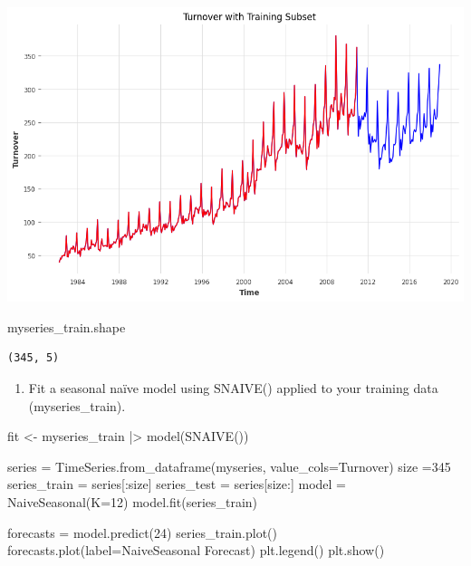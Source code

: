 \documentclass[
  11pt,
]{article}
\newenvironment{Shaded}{\begin{snugshade}}{\end{snugshade}}
\newcommand{\DecValTok}[1]{\textcolor[rgb]{0.68,0.00,0.00}{#1}}
\newcommand{\NormalTok}[1]{\textcolor[rgb]{0.00,0.23,0.31}{#1}}
\newcommand{\OperatorTok}[1]{\textcolor[rgb]{0.37,0.37,0.37}{#1}}
\newcommand{\StringTok}[1]{\textcolor[rgb]{0.13,0.47,0.30}{#1}}
\providecommand{\tightlist}{%
  \setlength{\itemsep}{0pt}\setlength{\parskip}{0pt}}\usepackage{longtable,booktabs,array}
\begin{document}
\includegraphics{hw3_files/figure-pdf/cell-51-output-1.png}

\begin{Shaded}
\begin{Highlighting}[]
\NormalTok{myseries\_train.shape}
\end{Highlighting}
\end{Shaded}

\begin{verbatim}
(345, 5)
\end{verbatim}

\begin{enumerate}
\def\labelenumi{\alph{enumi}.}
\setcounter{enumi}{2}
\tightlist
\item
  Fit a seasonal naïve model using SNAIVE() applied to your training
  data (myseries\_train).
\end{enumerate}

\begin{Shaded}
\begin{Highlighting}[]
\NormalTok{fit \textless{}{-} myseries\_train |\textgreater{}}
\NormalTok{  model(SNAIVE())}
\end{Highlighting}
\end{Shaded}

\begin{Shaded}
\begin{Highlighting}[]
\NormalTok{series }\OperatorTok{=}\NormalTok{ TimeSeries.from\_dataframe(myseries, value\_cols}\OperatorTok{=}\StringTok{\textquotesingle{}Turnover\textquotesingle{}}\NormalTok{)  }
\NormalTok{size }\OperatorTok{=}\DecValTok{345}
\NormalTok{series\_train }\OperatorTok{=}\NormalTok{ series[:size]}
\NormalTok{series\_test }\OperatorTok{=}\NormalTok{ series[size:]}
\NormalTok{model }\OperatorTok{=}\NormalTok{ NaiveSeasonal(K}\OperatorTok{=}\DecValTok{12}\NormalTok{) }
\NormalTok{model.fit(series\_train)}

\NormalTok{forecasts }\OperatorTok{=}\NormalTok{ model.predict(}\DecValTok{24}\NormalTok{) }
\NormalTok{series\_train.plot()}
\NormalTok{forecasts.plot(label}\OperatorTok{=}\StringTok{\textquotesingle{}NaiveSeasonal Forecast\textquotesingle{}}\NormalTok{)}
\NormalTok{plt.legend()}
\NormalTok{plt.show()}
\end{Highlighting}
\end{Shaded}
\end{document}
